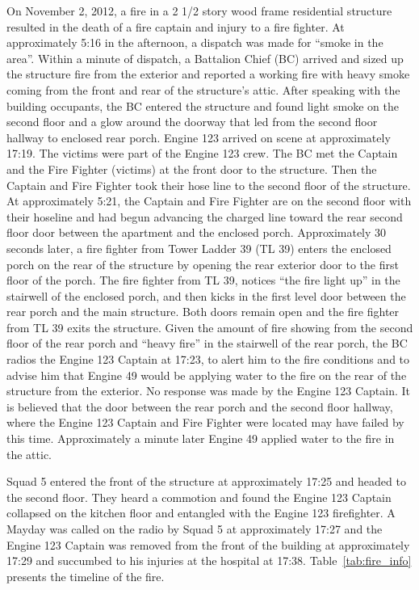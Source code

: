 \documentclass[11pt,oneside]{book}
\begin{document}
On November 2, 2012, a fire in a 2 1/2 story wood frame residential structure resulted in the death of a fire captain and injury to a fire fighter.  At approximately 5:16 in the afternoon, a dispatch was made for ``smoke in the area''.   Within a minute of dispatch, a Battalion Chief (BC) arrived and sized up the structure fire from the exterior and reported a working fire with heavy smoke coming from the front and rear of the structure's attic.  After speaking with the building occupants, the BC entered the structure and found light smoke on the second floor and a glow around the doorway that led from the second floor hallway to enclosed rear porch.  Engine 123 arrived on scene at approximately 17:19. The victims were part of the Engine 123 crew.  The BC met the Captain and the Fire Fighter (victims) at the front door to the structure.  Then the Captain and Fire Fighter took their hose line to the second floor of the structure.  At approximately 5:21, the Captain and Fire Fighter are on the second floor with their hoseline and had begun advancing the charged line toward the rear second floor door between the apartment and the enclosed porch.   Approximately 30 seconds later, a fire fighter from Tower Ladder 39 (TL 39) enters the enclosed porch on the rear of the structure by opening the rear exterior door to the first floor of the porch.   The fire fighter from TL 39, notices ``the fire light up'' in the stairwell of the enclosed porch, and then kicks in the first level door between the rear porch and the main structure.   Both doors remain open and the fire fighter from TL 39 exits the structure.  Given the amount of fire showing from the second floor of the rear porch and ``heavy fire'' in the stairwell of the rear porch, the BC radios the Engine 123 Captain at 17:23, to alert him to the fire conditions and to advise him that Engine 49 would be applying water to the fire on the rear of the structure from the exterior.  No response was made by the Engine 123 Captain.  It is believed that the door between the rear porch and the second floor hallway, where the Engine 123 Captain and Fire Fighter were located may have failed by this time.  Approximately a minute later Engine 49 applied water to the fire in the attic.

Squad 5 entered the front of the structure at approximately 17:25 and headed to the second floor.  They heard a commotion and found the Engine 123 Captain collapsed on the kitchen floor and entangled with the Engine 123 firefighter.  A Mayday was called on the radio by Squad 5 at approximately  17:27 and the Engine 123 Captain was removed from the front of the building at approximately 17:29 and succumbed to his injuries at the hospital at 17:38. Table~\ref{tab:fire_info} presents the timeline of the fire.
\end{document}
